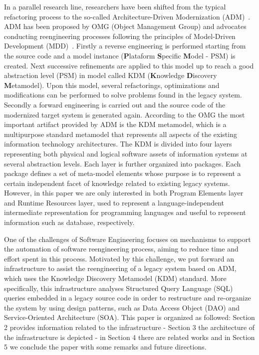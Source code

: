 In a parallel research line, researchers have been shifted from the typical refactoring process to the so-called Architecture-Driven Modernization (ADM)~\cite{ADMBook}. ADM has been proposed by OMG (Object Management Group)  and advocates conducting reengineering processes following the principles of Model-Driven Development (MDD)~\cite{ADMBook}.%
 Firstly a reverse engineering is performed starting from the source code and a model instance (\textbf{P}lataform \textbf{S}pecific \textbf{M}odel - PSM) is created. Next successive refinements are applied to this model up to reach a good abstraction level (PSM) in model called KDM (\textbf{K}nowledge \textbf{D}iscovery \textbf{M}etamodel). Upon this model, several refactorings, optimizations and modifications can be performed to solve problems found in the legacy system. Secondly a forward engineering is carried out and the source code of the modernized target system is generated again. According to the OMG the most important artifact provided by ADM is the KDM metamodel, which is a multipurpose standard metamodel that represents all aspects of the existing information  technology architectures. The KDM is divided into four layers representing both physical and logical software assets of information systems at several abstraction levels. Each layer is further organized into packages. Each package defines a set of meta-model elements whose purpose is to represent a certain independent facet of knowledge related to existing legacy systems.  However, in this paper we are only interested in both Program Elements layer and Runtime Resources layer, used to represent a language-independent intermediate representation for programming languages and useful to represent information such as database, respectively.

One of the challenges of Software Engineering focuses on mechanisms to support the automation of software reengineering process, aiming to reduce time and effort spent in this process.
 Motivated by this challenge, we put forward an infrastructure to assist the reengineering of a legacy system based on ADM, which uses the Knowledge Discovery Metamodel (KDM) standard. More specifically, this infrastructure analyses Structured Query Language (SQL) queries embedded in a legacy source code in order to restructure and re-organize the system by using design patterns, such as Data Access Object (DAO) and Service-Oriented Architecture (SOA).  
This paper is organized as followed: Section 2 provides information related to the infrastructure - Section 3 the architecture of the infrastructure is depicted - in Section 4 there are related works and in Section 5 we conclude the paper with some remarks and future directions.